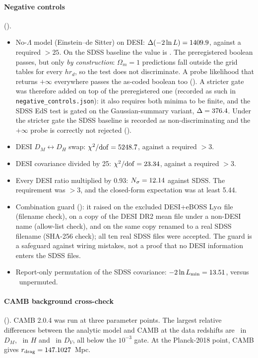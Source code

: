 \documentclass[11pt]{article}
\begin{document}
\paragraph{Negative controls} (\NcAll).
\begin{itemize}
\item No-$\Lambda$ model (Einstein--de Sitter) on DESI:
  $\Delta(-2\ln L)=1409.9$, against a required $>25$. On the SDSS
  baseline the value is \NcEdsSdss. The preregistered boolean passes, but
  only \emph{by construction}: $\Omega_m=1$ predictions fall outside the grid
  tables for every $h r_d$, so the test does not discriminate. A probe
  likelihood that returns $+\infty$ everywhere passes the as-coded boolean
  too (\NcProbeAsCoded). A stricter gate was therefore added on top of
  the preregistered one (recorded as such in
  \texttt{negative\_controls.json}): it also requires both minima to be
  finite, and the SDSS EdS test is gated on the Gaussian-summary variant,
  $\Delta=376.4$. Under the stricter gate the SDSS baseline is recorded
  as non-discriminating and the $+\infty$ probe is correctly not rejected
  (\NcProbeOk).
\item DESI $D_M\leftrightarrow D_H$ swap: $\chi^2/\mathrm{dof}=5248.7$,
  against a required $>3$.
\item DESI covariance divided by 25: $\chi^2/\mathrm{dof}=23.34$, against a
  required $>3$.
\item Every DESI ratio multiplied by 0.93: $N_\sigma=12.14$ against SDSS.
  The requirement was $>3$, and the closed-form expectation was at least
  5.44.
\item Combination guard (\NcGuard): it raised on the excluded DESI+eBOSS
  Ly$\alpha$ file (filename check), on a copy of the DESI DR2 mean file under
  a non-DESI name (allow-list check), and on the same copy renamed to a real
  SDSS filename (SHA-256 check); all ten real SDSS files were accepted. The
  guard is a
  safeguard against wiring mistakes, not a proof that no DESI information
  enters the SDSS files.
\item Report-only permutation of the SDSS covariance:
  $-2\ln L_\mathrm{min}=13.51$, versus \NcPermRef\ unpermuted.
\end{itemize}

\paragraph{CAMB background cross-check}\label{sec:camb} (\CambPass). CAMB
2.0.4 was run at three parameter points. The largest relative differences
between the analytic model and CAMB at the data redshifts are \CambDM\ in
$D_M$, \CambH\ in $H$ and \CambDV\ in $D_V$, all below the $10^{-3}$ gate.
At the Planck-2018 point, CAMB gives $r_\mathrm{drag}=147.1027$~Mpc.
\end{document}
